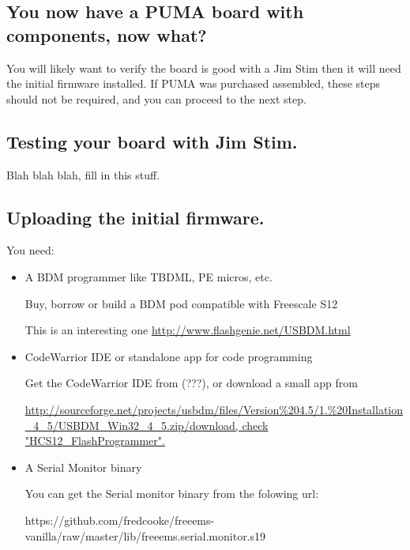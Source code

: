 \documentclass[12pt,a4paper,titlepage]{article}
\begin{document}
\subsection{You now have a PUMA board with components, now what?}

You will likely want to verify the board is good with a Jim Stim  then it will need the initial firmware installed. If PUMA was purchased assembled, these steps should not be required, and you can proceed to the next step.

\subsection{Testing your board with Jim Stim.}

Blah blah blah, fill in this stuff.

\subsection{Uploading the initial firmware.}

You need:
\begin{itemize}
\item A BDM programmer like TBDML, PE micros, etc.

Buy, borrow or build a BDM pod compatible with Freescale S12

This is an interesting one \url{http://www.flashgenie.net/USBDM.html}

\item CodeWarrior IDE or standalone app for code programming

Get the CodeWarrior IDE from (???), or download a small app from

\url{http://sourceforge.net/projects/usbdm/files/Version%204.5/1.%20Installation_4_5/USBDM_Win32_4_5.zip/download, check "HCS12_FlashProgrammer".}

\item A Serial Monitor binary

You can get the Serial monitor binary from the folowing url:
\newline

https://github.com/fredcooke/freeems-vanilla/raw/master/lib/freeems.serial.monitor.s19
\newline


\end{itemize}
\end{document}
